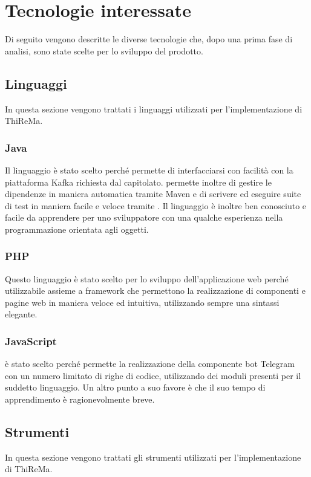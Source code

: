 \section{Tecnologie interessate}
	Di seguito vengono descritte le diverse tecnologie che, dopo una prima fase di analisi, sono state scelte per lo sviluppo del prodotto.
	\subsection{Linguaggi}
		In questa sezione vengono trattati i linguaggi utilizzati per l'implementazione di ThiReMa.
		\subsubsection{Java}
			Il linguaggio è stato scelto perché permette di interfacciarsi con facilità con la piattaforma Kafka richiesta dal capitolato.  permette inoltre di gestire le dipendenze in maniera automatica tramite Maven e di scrivere ed eseguire suite di test in maniera facile e veloce tramite .
			\newline
			Il linguaggio è inoltre ben conosciuto e facile da apprendere per uno sviluppatore con una qualche esperienza nella programmazione orientata agli oggetti. 
		\subsubsection{PHP}
			Questo linguaggio è stato scelto per lo sviluppo dell'applicazione web perché utilizzabile assieme a framework che permettono la realizzazione di componenti e pagine web in maniera veloce ed intuitiva, utilizzando sempre una sintassi elegante.
		\subsubsection{JavaScript}
			 è stato scelto perché permette la realizzazione della componente bot Telegram con un numero limitato di righe di codice, utilizzando dei moduli presenti per il suddetto linguaggio.
			\newline
			Un altro punto a suo favore è che il suo tempo di apprendimento è ragionevolmente breve.
	\subsection{Strumenti}
		In questa sezione vengono trattati gli strumenti utilizzati per l'implementazione di ThiReMa.
